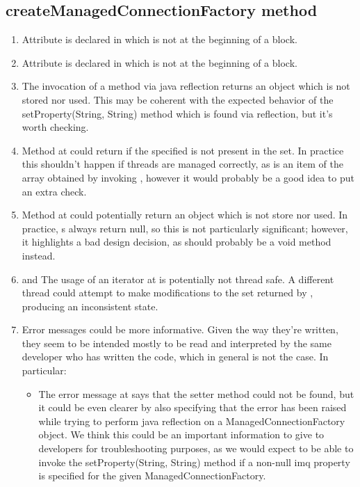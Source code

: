 \subsection{createManagedConnectionFactory method}
\begin{enumerate}
	\item {} Attribute  is declared in  which is not at the beginning of a block. 
	\item {} Attribute  is declared in  which is not at the beginning of a block.
	\item {} The invocation of a method via java reflection returns an  object which is not stored nor used. This may be coherent with the expected behavior of the setProperty(String, String) method which is found via reflection, but it's worth checking. 
	\item {} Method  at  could return  if the specified  is not present in the  set. In practice this shouldn't happen if threads are managed correctly, as  is an item of the array obtained by invoking , however it would probably be a good idea to put an extra check. 
	\item {} Method  at  could potentially return an  object which is not store nor used. In practice, s always return null, so this is not particularly significant; however, it highlights a bad design decision, as  should probably be a void method instead. 
	\item {} and  The usage of an iterator at  is potentially not thread safe. A different thread could attempt to make modifications to the set returned by , producing an inconsistent state. 
	\item {} Error messages could be more informative. Given the way they're written, they seem to be intended mostly to be read and interpreted by the same developer who has written the code, which in general is not the case. In particular:
		\begin{itemize}
			\item The error message at  says that the setter method could not be found, but it could be even clearer by also specifying that the error has been raised while trying to perform java reflection on a ManagedConnectionFactory object. We think this could be an important information to give to developers for troubleshooting purposes, as we would expect to be able to invoke the setProperty(String, String) method if a non-null imq property is specified for the given ManagedConnectionFactory. 

\end{itemize}
\end{enumerate}
